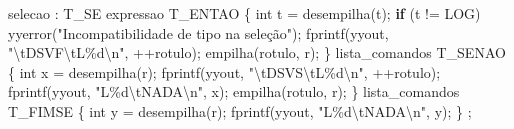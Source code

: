 \documentclass[
  brazilian,
  letterpaper,
]{book}
\newenvironment{Shaded}{\begin{snugshade}}{\end{snugshade}}
\newcommand{\CharTok}[1]{\textcolor[rgb]{0.13,0.47,0.30}{#1}}
\newcommand{\ControlFlowTok}[1]{\textcolor[rgb]{0.00,0.23,0.31}{\textbf{#1}}}
\newcommand{\DataTypeTok}[1]{\textcolor[rgb]{0.68,0.00,0.00}{#1}}
\newcommand{\NormalTok}[1]{\textcolor[rgb]{0.00,0.23,0.31}{#1}}
\newcommand{\OperatorTok}[1]{\textcolor[rgb]{0.37,0.37,0.37}{#1}}
\newcommand{\SpecialCharTok}[1]{\textcolor[rgb]{0.37,0.37,0.37}{#1}}
\newcommand{\StringTok}[1]{\textcolor[rgb]{0.13,0.47,0.30}{#1}}
\theoremstyle{plain}
\theoremstyle{definition}
\theoremstyle{remark}
\begin{document}
\begin{Shaded}
\begin{Highlighting}[]
\NormalTok{selecao}
    \OperatorTok{:}\NormalTok{ T\_SE expressao T\_ENTAO}
        \OperatorTok{\{} 
            \DataTypeTok{int}\NormalTok{ t }\OperatorTok{=}\NormalTok{ desempilha}\OperatorTok{(}\CharTok{\textquotesingle{}t\textquotesingle{}}\OperatorTok{);}
            \ControlFlowTok{if} \OperatorTok{(}\NormalTok{t }\OperatorTok{!=}\NormalTok{ LOG}\OperatorTok{)}
\NormalTok{                yyerror}\OperatorTok{(}\StringTok{"Incompatibilidade de tipo na seleção"}\OperatorTok{);}
\NormalTok{            fprintf}\OperatorTok{(}\NormalTok{yyout}\OperatorTok{,} \StringTok{"}\SpecialCharTok{\textbackslash{}t}\StringTok{DSVF}\SpecialCharTok{\textbackslash{}t}\StringTok{L}\SpecialCharTok{\%d\textbackslash{}n}\StringTok{"}\OperatorTok{,} \OperatorTok{++}\NormalTok{rotulo}\OperatorTok{);}
\NormalTok{            empilha}\OperatorTok{(}\NormalTok{rotulo}\OperatorTok{,} \CharTok{\textquotesingle{}r\textquotesingle{}}\OperatorTok{);} 
        \OperatorTok{\}} 
\NormalTok{      lista\_comandos T\_SENAO }
        \OperatorTok{\{} 
            \DataTypeTok{int}\NormalTok{ x }\OperatorTok{=}\NormalTok{ desempilha}\OperatorTok{(}\CharTok{\textquotesingle{}r\textquotesingle{}}\OperatorTok{);}
\NormalTok{            fprintf}\OperatorTok{(}\NormalTok{yyout}\OperatorTok{,} \StringTok{"}\SpecialCharTok{\textbackslash{}t}\StringTok{DSVS}\SpecialCharTok{\textbackslash{}t}\StringTok{L}\SpecialCharTok{\%d\textbackslash{}n}\StringTok{"}\OperatorTok{,} \OperatorTok{++}\NormalTok{rotulo}\OperatorTok{);}
\NormalTok{            fprintf}\OperatorTok{(}\NormalTok{yyout}\OperatorTok{,} \StringTok{"L}\SpecialCharTok{\%d\textbackslash{}t}\StringTok{NADA}\SpecialCharTok{\textbackslash{}n}\StringTok{"}\OperatorTok{,}\NormalTok{ x}\OperatorTok{);}
\NormalTok{            empilha}\OperatorTok{(}\NormalTok{rotulo}\OperatorTok{,} \CharTok{\textquotesingle{}r\textquotesingle{}}\OperatorTok{);}
        \OperatorTok{\}}
\NormalTok{      lista\_comandos T\_FIMSE}
        \OperatorTok{\{} 
            \DataTypeTok{int}\NormalTok{ y }\OperatorTok{=}\NormalTok{ desempilha}\OperatorTok{(}\CharTok{\textquotesingle{}r\textquotesingle{}}\OperatorTok{);}
\NormalTok{            fprintf}\OperatorTok{(}\NormalTok{yyout}\OperatorTok{,} \StringTok{"L}\SpecialCharTok{\%d\textbackslash{}t}\StringTok{NADA}\SpecialCharTok{\textbackslash{}n}\StringTok{"}\OperatorTok{,}\NormalTok{ y}\OperatorTok{);} 
        \OperatorTok{\}}
    \OperatorTok{;}


\end{Highlighting}
\end{Shaded}
\end{document}
